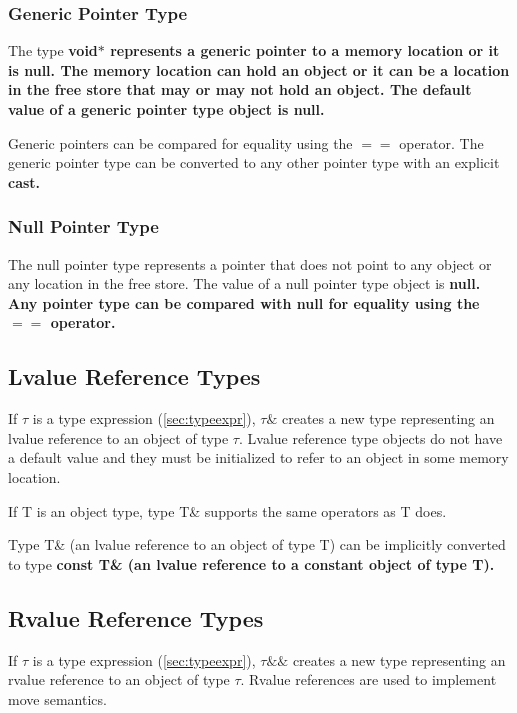 \documentclass[a4paper,oneside,11pt]{article}
\begin{document}
\subsubsection{Generic Pointer Type}

The type \bf{void$*$} represents a generic pointer to a memory location or it is \bf{null}.
The memory location can hold an object or it can be a location in the free store that
may or may not hold an object.
The default value of a generic pointer type object is \bf{null}.

Generic pointers can be compared for equality using the $==$ operator.
The generic pointer type can be converted to any other pointer type with an explicit \bf{cast}.

\subsubsection{Null Pointer Type}

The null pointer type represents a pointer that does not point to any object or any location in the free store.
The value of a null pointer type object is \bf{null}.
Any pointer type can be compared with \bf{null} for equality using the $==$ operator.

\subsection{Lvalue Reference Types}\label{sec:lvaluereferencetypes}

If $\tau$ is a type expression (\ref{sec:typeexpr}), $\tau\&$ creates a new type representing an lvalue reference to an object of type $\tau$.
Lvalue reference type objects do not have a default value and they must be initialized to refer to an object in some memory location.

If T is an object type, type T\& supports the same operators as T does.

Type T\& (an lvalue reference to an object of type T) can be implicitly converted to type \bf{const} T\&
(an lvalue reference to a constant object of type T).

\subsection{Rvalue Reference Types}\label{sec:rvaluereferencetypes}

If $\tau$ is a type expression (\ref{sec:typeexpr}), $\tau\&\&$ creates a new type representing an rvalue reference to an object of type $\tau$.
Rvalue references are used to implement move semantics.
\end{document}
